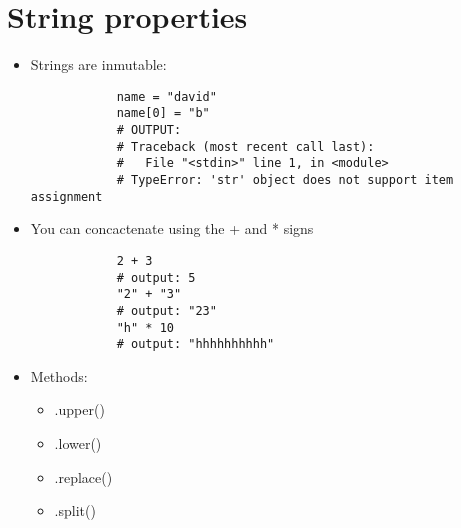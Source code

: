 \section{String properties}
\begin{itemize}
    \item Strings are inmutable: 
        \begin{verbatim}
            name = "david"
            name[0] = "b" 
            # OUTPUT: 
            # Traceback (most recent call last):
            #   File "<stdin>" line 1, in <module>
            # TypeError: 'str' object does not support item assignment
        \end{verbatim}

        
    
    \item You can concactenate using the + and * signs
        \begin{verbatim}
            2 + 3 
            # output: 5
            "2" + "3" 
            # output: "23"
            "h" * 10 
            # output: "hhhhhhhhhh" 
        \end{verbatim}
    
    \item Methods: 
        \begin{itemize}
            \item .upper()
            \item .lower()
            \item .replace()
            \item .split()
        \end{itemize}
\end{itemize}


